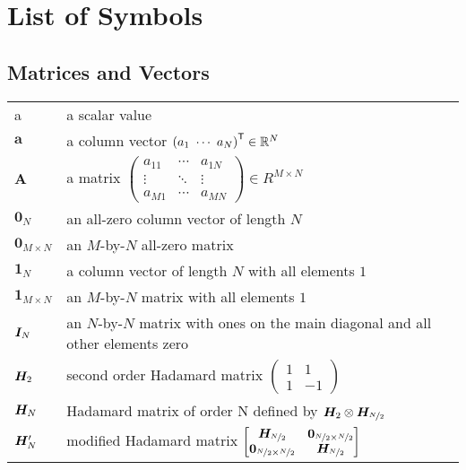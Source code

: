 \chapter*{List of Symbols}
\section*{Matrices and Vectors}
\begin{tabular}{ p{2cm} l }
    a           & a scalar value \\

    $\bm{a}$    & a column vector $\left( a_1 \ \cdots \ a_N \right)^\mathsf{T} \in \mathbb{R}^{N}$ \\

    $\bm{A}$    & a matrix
    $\begin{pmatrix}
        a_{11} & \cdots & a_{1N} \\
        \vdots & \ddots & \vdots \\
        a_{M1} & \cdots & a_{MN}
    \end{pmatrix} \in R^{M \times N}
    $ \\

    $\bm{0}_N$  & an all-zero column vector of length $N$ \\
    $\bm{0}_{M \times N}$    & an $M$-by-$N$ all-zero matrix \\
    $\bm{1}_N$  & a column vector of length $N$ with all elements $1$ \\
    $\bm{1}_{M \times N}$    & an $M$-by-$N$ matrix with all elements $1$ \\

    $\bm{I}_{N}$  & an $N$-by-$N$ matrix with ones on the main diagonal and all other elements zero \\

    $\bm{H_}{2}$    & second order Hadamard matrix
    $
    \begin{pmatrix}
        1 & 1 \\
        1 & -1
    \end{pmatrix}
    $ \\

    $\bm{H_}{N}$    & Hadamard matrix of order N defined by $\bm{H_}{2} \otimes \bm{H_}{\nicefrac{N}{2}}$ \\

    $\bm{H_}{N}'$   & modified Hadamard matrix
    $
    \begin{bmatrix}
        \bm{H_}{\nicefrac{N}{2}} & \bm{0}_{\nicefrac{N}{2} \times \nicefrac{N}{2}} \\
        \bm{0}_{\nicefrac{N}{2} \times \nicefrac{N}{2}} & \bm{H_}{\nicefrac{N}{2}}
    \end{bmatrix}
    $ \\


\end{tabular}
